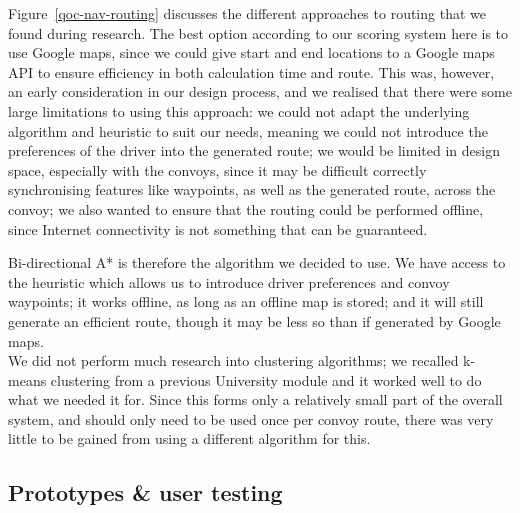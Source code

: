 \documentclass{article}
\begin{document}
Figure~\ref{qoc-nav-routing} discusses the different approaches to routing that we found during research. The best option according to our scoring system here is to use Google maps, since we could give start and end locations to a Google maps API to ensure efficiency in both calculation time and route. This was, however, an early consideration in our design process, and we realised that there were some large limitations to using this approach: we could not adapt the underlying algorithm and heuristic to suit our needs, meaning we could not introduce the preferences of the driver into the generated route; we would be limited in design space, especially with the convoys, since it may be difficult correctly synchronising features like waypoints, as well as the generated route, across the convoy; we also wanted to ensure that the routing could be performed offline, since Internet connectivity is not something that can be guaranteed.

Bi-directional A* is therefore the algorithm we decided to use. We have access to the heuristic which allows us to introduce driver preferences and convoy waypoints; it works offline, as long as an offline map is stored; and it will still generate an efficient route, though it may be less so than if generated by Google maps.\\

We did not perform much research into clustering algorithms; we recalled k-means clustering from a previous University module and it worked well to do what we needed it for. Since this forms only a relatively small part of the overall system, and should only need to be used once per convoy route, there was very little to be gained from using a different algorithm for this.

%
%

\subsection{Prototypes \& user testing}\label{ssec:nav-prototypes-testing}
\end{document}
